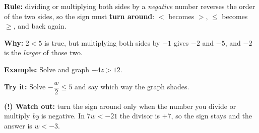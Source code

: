 \documentclass[12pt]{article}
\begin{document}

\begin{formulabox}
\textbf{Rule:} dividing or multiplying both sides by a \emph{negative} number
reverses the order of the two sides, so the sign must \textbf{turn around}:
$<$ becomes $>$, $\le$ becomes $\ge$, and back again.\par
\textbf{Why:} $2 < 5$ is true, but multiplying both sides by $-1$ gives $-2$ and
$-5$, and $-2$ is the \emph{larger} of those two.
\end{formulabox}

\begin{examplebox}
\textbf{Example:} \quad Solve and graph $-4z > 12$.
\end{examplebox}

\begin{tryitbox}
\textbf{Try it:} \quad Solve $-\dfrac{w}{2} \le 5$ and say which way the graph
shades.\\[2pt]
\end{tryitbox}

\begin{watchoutbox}
\textbf{(!) Watch out:} turn the sign around only when the number you divide or
multiply \emph{by} is negative. In $7w < -21$ the divisor is $+7$, so the sign
stays and the answer is $w < -3$.
\end{watchoutbox}
\end{document}
